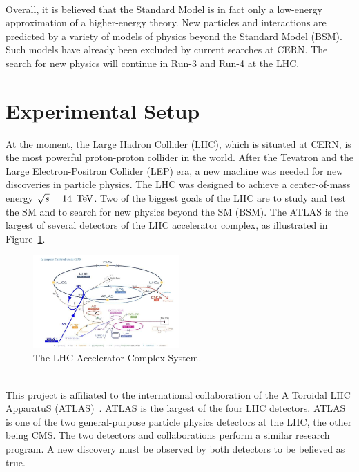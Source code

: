 \ \\Overall, it is believed that the Standard Model is in fact only a low-energy approximation of a higher-energy theory. New particles and interactions are predicted by a variety of models of physics beyond the Standard Model (BSM). Such models have already been excluded by current searches at CERN. The search for new physics will continue in Run-3 and Run-4 at the LHC.

\section{Experimental Setup}
\label{sec:ExperimentalSetup}

At the moment, the Large Hadron Collider (LHC), which is situated at CERN, is the most powerful proton-proton collider in the world. After the Tevatron and the Large Electron-Positron Collider (LEP) era, a new machine was needed for new discoveries in particle physics. The LHC was designed to achieve a center-of-mass energy $\sqrt{s}=14\,\TeV$. Two of the biggest goals of the LHC are to study and test the SM and to search for new physics beyond the SM (BSM). The ATLAS is the largest of several detectors of the LHC accelerator complex, as illustrated in Figure~\ref{fig:LHC}.

\begin{figure}[!htb]
  \centering
  \includegraphics[width=0.5\textwidth]{plots/LHC.png} 
  \caption{The LHC Accelerator Complex System.}
  \label{fig:LHC}
\end{figure}

\ \\This project is affiliated to the international collaboration of the A Toroidal LHC ApparatuS (ATLAS)~\cite{ATLAS}\cite{ATLASUrl}. ATLAS is the largest of the four LHC detectors. ATLAS is one of the two general-purpose particle physics detectors at the LHC, the other being CMS. The two detectors and collaborations perform a similar research program. A new discovery must be observed by both detectors to be believed as true. 

